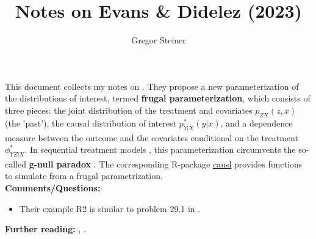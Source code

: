 \documentclass[10pt]{article}
\author{Gregor Steiner}
\title{Notes on Evans \& Didelez (2023)}
\begin{document}
\maketitle

This document collects my notes on \cite{evans_didelez_2023}. They propose a new parameterization of the distributions of interest, termed \textbf{frugal parameterization}, which consists of three pieces: the joint distribution of the treatment and covariates $p_{ZX}(z, x)$ (the 'past'), the causal distribution of interest $p_{Y | X}^* (y|x)$, and a dependence measure between the outcome and the covariates conditional on the treatment $\phi_{YZ | X}^*$. In sequential treatment models \citep[see][Figure 2]{evans_didelez_2023}, this parameterization circumvents the so-called \textbf{g-null paradox} \citep{robins_wasserman_1997}. The corresponding R-package \href{https://github.com/rje42/causl}{causl} provides functions to simulate from a frugal parametrization. \\

\textbf{Comments/Questions:}
\begin{itemize}
	\item Their example R2 is similar to problem 29.1 in \cite{ding2023course}.
\end{itemize}

\textbf{Further reading:} \cite{robins_wasserman_1997}, \cite{mcgrath2022revisiting}.









\end{document}
